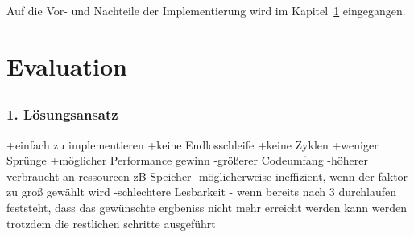 \documentclass{article}
\begin{document}
    Auf die Vor- und Nachteile der Implementierung wird im Kapitel~\ref{Evaluation} eingegangen.
    \newpage
    \section{Evaluation}
    \label{Evaluation}
    \subsection{}
    \subsubsection{1. Lösungsansatz}
    +einfach zu implementieren
    +keine Endlosschleife
    +keine Zyklen
    +weniger Sprünge
    +möglicher Performance gewinn
    -größerer Codeumfang 
    -höherer verbraucht an ressourcen zB Speicher
    -möglicherweise ineffizient, wenn der faktor zu groß gewählt wird
    -schlechtere Lesbarkeit
    - wenn bereits nach 3 durchlaufen feststeht, dass das gewünschte ergbeniss nicht mehr erreicht werden kann werden trotzdem die restlichen schritte ausgeführt
\end{document}
